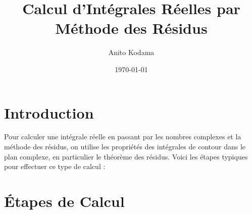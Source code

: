 \documentclass[a4paper,11pt]{article}
\title{Calcul d'Intégrales Réelles par Méthode des Résidus}
\author{Anito Kodama}
\date{\today}
\begin{document}
\maketitle

\section{Introduction}

Pour calculer une intégrale réelle en passant par les nombres complexes et la méthode des résidus, on utilise les propriétés des intégrales de contour dans le plan complexe, en particulier le théorème des résidus. Voici les étapes typiques pour effectuer ce type de calcul :

\section{Étapes de Calcul}
\end{document}
